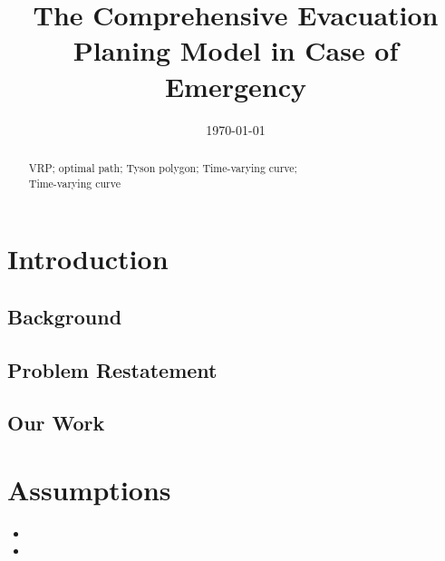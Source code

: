 \documentclass{mcmthesis}
\title{\large The Comprehensive Evacuation Planing Model in Case of Emergency}
\author{ }
\date{\today}
\begin{document}
\begin{abstract}



\begin{keywords}
VRP; optimal path; Tyson polygon; Time-varying curve; \\ \hspace*{1.2cm}Time-varying curve
\end{keywords}
\end{abstract}
\maketitle
\newpage                                                          %
\begin{adjustwidth}{-1cm}{0cm}

\setcounter{tocdepth}{3}
\thispagestyle{empty}
\tableofcontents                                                  %

\end{adjustwidth}


\newpage

\pagestyle{fancy}

\setcounter{page}{1}
\section{Introduction}
\subsection{Background}


\subsection{Problem Restatement}



\subsection{Our Work}


\section{Assumptions}

\begin{itemize}
\item 
\item 
\end{itemize}
\end{document}
